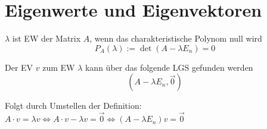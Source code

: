 \documentclass{article}
\begin{document}
\newpage


\section{Eigenwerte und Eigenvektoren}
$\lambda$ ist EW der Matrix $A$, wenn das charakteristische Polynom null wird
	\begin{equation}
		P_A(\lambda) := \det(A - \lambda E_n) = 0
	\end{equation}

Der EV $v$ zum EW $\lambda$ kann über das folgende LGS gefunden werden
	\begin{equation}
		(A - \lambda E_n, \vec{0})
	\end{equation}

\textcolor{gruen}{Folgt durch Umstellen der Definition: $A\cdot v = \lambda v \Leftrightarrow A\cdot v - \lambda v= \vec{0} \Leftrightarrow (A - \lambda E_n)v = \vec{0}$}

\vspace{0.5cm}
\end{document}
